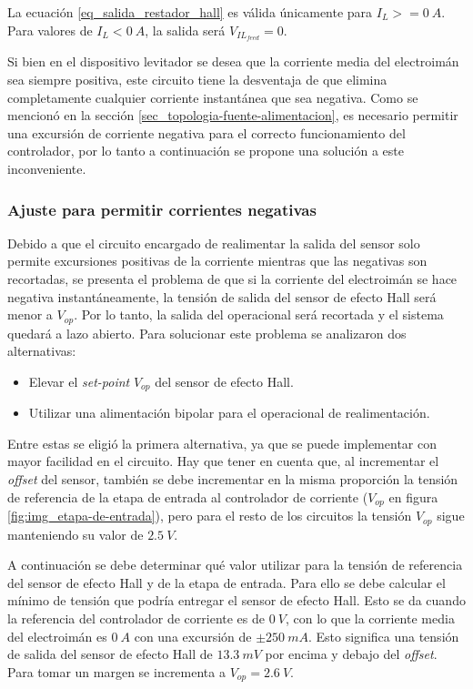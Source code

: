 La ecuación \ref{eq_salida_restador_hall} es válida únicamente para $I_L>=0\:A$. Para valores de $I_L<0\:A$, la salida será $V_{IL_{feed}}=0$.

Si bien en el dispositivo levitador se desea que la corriente media del electroimán sea siempre positiva, este circuito tiene la desventaja de que elimina completamente cualquier corriente instantánea que sea negativa. Como se mencionó en la sección \ref{sec_topologia-fuente-alimentacion}, es necesario permitir una excursión de corriente negativa para el correcto funcionamiento del controlador, por lo tanto a continuación se propone una solución a este inconveniente.

\subsubsection{Ajuste para permitir corrientes negativas}

Debido a que el circuito encargado de realimentar la salida del sensor solo permite excursiones positivas de la corriente mientras que las negativas son recortadas, se presenta el problema de que si la corriente del electroimán se hace negativa instantáneamente, la tensión de salida del sensor de efecto Hall será menor a $V_{op}$. Por lo tanto, la salida del operacional será recortada y el sistema quedará a lazo abierto. Para solucionar este problema se analizaron dos alternativas:

\begin{itemize} 
	\item Elevar el \textsl{set-point}  $V_{op}$ del sensor de efecto Hall.
	
	\item Utilizar una alimentación bipolar para el operacional de realimentación.
\end{itemize}

Entre estas se eligió la primera alternativa, ya que se puede implementar con mayor facilidad en el circuito. Hay que tener en cuenta que, al incrementar el \textsl{offset} del sensor, también se debe incrementar en la misma proporción la tensión de referencia de la etapa de entrada al controlador de corriente ($V_{op}$ en figura \ref{fig:img_etapa-de-entrada}), pero para el resto de los circuitos la tensión $V_{op}$ sigue manteniendo su valor de $2.5\:V$.

A continuación se debe determinar qué valor utilizar para la tensión de referencia del sensor de efecto Hall y de la etapa de entrada. Para ello se debe calcular el mínimo de tensión que podría entregar el sensor de efecto Hall. Esto se da cuando la referencia del controlador de corriente es de $0\:V$, con lo que la corriente media del electroimán es $0 \:A$ con una excursión de $±250\:mA$. Esto significa una tensión de salida del sensor de efecto Hall de $13.3\:mV$ por encima y debajo del \textsl{offset}. Para tomar un margen se incrementa a $V_{op}=2.6\:V$. 

